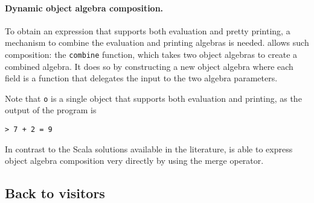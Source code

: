 \paragraph{Dynamic object algebra composition.}
To obtain an expression that supports both evaluation and pretty
printing, a mechanism to combine the evaluation and printing
algebras is needed. \name allows such composition: the \lstinline$combine$
function, which takes two object algebras to create a combined algebra. It
does so by constructing a new object algebra where each field is a
function that delegates the input to the two algebra parameters.
\begin{comment}
  \begin{lstlisting}{language=F2J}
    let combine[A,B](f: ExpAlg[A])(g: ExpAlg[B]) :
    ExpAlg[A&B] = {
      lit = \(x: Int) -> f.lit x ,, g.lit x,
      add = \(x: A & B) (y: A & B) ->
      f.add x y ,, g.add x y
    }
  \end{lstlisting}
\end{comment}

\begin{comment}
  \begin{lstlisting}{language=F2J}
    let newAlg =
    combine[IEval,IPrint] subEvalAlg printAlg;
    let o = e1[IEval&IPrint] newAlg;
    o.print ++ " = " ++ o.eval.toString()
  \end{lstlisting}
\end{comment}


Note that \lstinline$o$ is a single object that supports both
evaluation and printing, as the output of the program is
\begin{lstlisting}
> 7 + 2 = 9
\end{lstlisting}

In contrast to the Scala solutions available in the
literature, \name is able to express object algebra
composition very directly by using the merge operator.

\subsection{Back to visitors}

